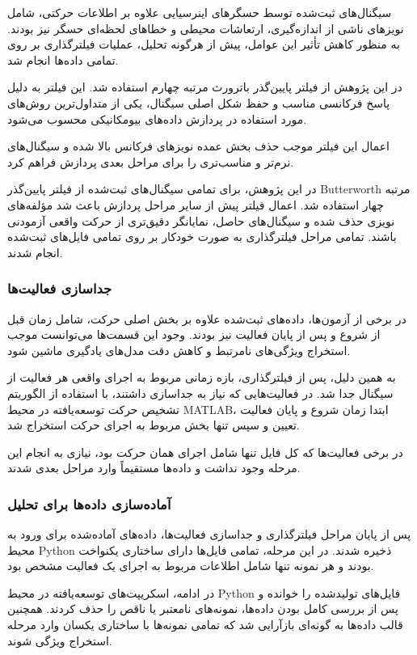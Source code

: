 سیگنال‌های ثبت‌شده توسط حسگرهای اینرسیایی علاوه بر اطلاعات حرکتی، شامل نویزهای ناشی از اندازه‌گیری، ارتعاشات محیطی و خطاهای لحظه‌ای حسگر نیز بودند. به منظور کاهش تأثیر این عوامل، پیش از هرگونه تحلیل، عملیات فیلترگذاری بر روی تمامی داده‌ها انجام شد.

در این پژوهش از فیلتر پایین‌گذر باترورث مرتبه چهارم استفاده شد. این فیلتر به دلیل پاسخ فرکانسی مناسب و حفظ شکل اصلی سیگنال، یکی از متداول‌ترین روش‌های مورد استفاده در پردازش داده‌های بیومکانیکی محسوب می‌شود.

اعمال این فیلتر موجب حذف بخش عمده نویزهای فرکانس بالا شده و سیگنال‌های نرم‌تر و مناسب‌تری را برای مراحل بعدی پردازش فراهم کرد.

در این پژوهش، برای تمامی سیگنال‌های ثبت‌شده از فیلتر پایین‌گذر Butterworth مرتبه چهار استفاده شد. اعمال فیلتر پیش از سایر مراحل پردازش باعث شد مؤلفه‌های نویزی حذف شده و سیگنال‌های حاصل، نمایانگر دقیق‌تری از حرکت واقعی آزمودنی باشند. تمامی مراحل فیلترگذاری به صورت خودکار بر روی تمامی فایل‌های ثبت‌شده انجام شدند.


\subsubsection{جداسازی فعالیت‌ها}

در برخی از آزمون‌ها، داده‌های ثبت‌شده علاوه بر بخش اصلی حرکت، شامل زمان قبل از شروع و پس از پایان فعالیت نیز بودند. وجود این قسمت‌ها می‌توانست موجب استخراج ویژگی‌های نامرتبط و کاهش دقت مدل‌های یادگیری ماشین شود.

به همین دلیل، پس از فیلترگذاری، بازه زمانی مربوط به اجرای واقعی هر فعالیت از سیگنال جدا شد. در فعالیت‌هایی که نیاز به جداسازی داشتند، با استفاده از الگوریتم تشخیص حرکت توسعه‌یافته در محیط MATLAB، ابتدا زمان شروع و پایان فعالیت تعیین و سپس تنها بخش مربوط به اجرای حرکت استخراج شد.

در برخی فعالیت‌ها که کل فایل تنها شامل اجرای همان حرکت بود، نیازی به انجام این مرحله وجود نداشت و داده‌ها مستقیماً وارد مراحل بعدی شدند.


\subsubsection{آماده‌سازی داده‌ها برای تحلیل}

پس از پایان مراحل فیلترگذاری و جداسازی فعالیت‌ها، داده‌های آماده‌شده برای ورود به محیط Python ذخیره شدند. در این مرحله، تمامی فایل‌ها دارای ساختاری یکنواخت بودند و هر نمونه تنها شامل اطلاعات مربوط به اجرای یک فعالیت مشخص بود.

در ادامه، اسکریپت‌های توسعه‌یافته در محیط Python فایل‌های تولیدشده را خوانده و پس از بررسی کامل بودن داده‌ها، نمونه‌های نامعتبر یا ناقص را حذف کردند. همچنین قالب داده‌ها به گونه‌ای بازآرایی شد که تمامی نمونه‌ها با ساختاری یکسان وارد مرحله استخراج ویژگی شوند.

